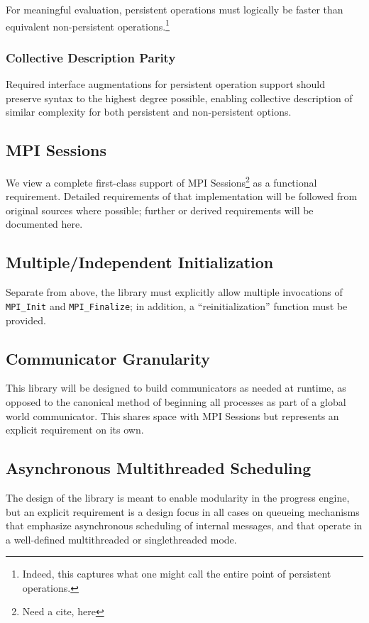 \documentclass{article}
\begin{document}
For meaningful evaluation, persistent operations must logically be faster than equivalent non-persistent operations.\footnote{Indeed, this captures what one might call the entire point of persistent operations.}

\subsubsection{Collective Description Parity}

Required interface augmentations for persistent operation support should preserve syntax to the highest degree possible, enabling collective description of similar complexity for both persistent and non-persistent options.

\subsection{MPI Sessions}

We view a complete first-class support of MPI Sessions\footnote{Need a cite, here} as a functional requirement.  Detailed requirements of that implementation will be followed from original sources where possible; further or derived requirements will be documented here.

\subsection{Multiple/Independent Initialization}

Separate from above, the library must explicitly allow multiple invocations of \texttt{MPI\_Init} and \texttt{MPI\_Finalize}; in addition, a ``reinitialization'' function must be provided.

\subsection{Communicator Granularity}

This library will be designed to build communicators as needed at runtime, as opposed to the canonical method of beginning all processes as part of a global world communicator.  This shares space with MPI Sessions but represents an explicit requirement on its own.

\subsection{Asynchronous Multithreaded Scheduling}

The design of the library is meant to enable modularity in the progress engine, but an explicit requirement is a design focus in all cases on queueing mechanisms that emphasize asynchronous scheduling of internal messages, and that operate in a well-defined multithreaded or singlethreaded mode.
\end{document}
